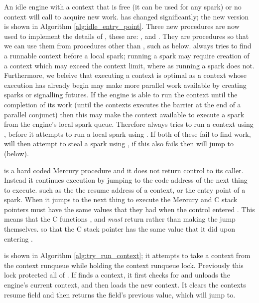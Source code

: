 An idle engine with a context that is free (it can be used for any spark) or
no context will call \idle to acquire new work.
\idle has changed significantly;
the new version is shown in Algorithm \ref{alg:idle_entry_point}.
Three new procedures are now used to implement the details of \idle, these
are:
\tryruncontext, \tryrunlocalspark and \trystealspark.
They are procedures so that we can use them from procedures other than
\idle, such as \joinandcontinue below.
\idle always tries to find a runnable context before a local spark;
running a spark may require creation of a context which may exceed the
context limit,
where as running a spark does not.
Furthermore,
we beleive that executing a context is optimal
as a context whose execution has already begin may make more parallel work
available by creating sparks or signalling futures.
If the engine is able to run the context until the completion of its work
(until the contexts executes the \joinandcontinue barrier at the end of a
parallel conjunct)
then this may make the context available to execute a spark from the
engine's local spark queue.
Therefore \idle always tries to run a context using \tryruncontext,
before it attempts to run a local spark using \tryrunlocalspark.
If both of these fail to find work, \idle will then attempt to steal a spark using
\trystealspark,
if this also fails then \idle will jump to \sleep (below).

\idle is a hard coded Mercury procedure and it does not return control to
its caller.
Instead it continues execution by jumping to the code address of the next
thing to execute.
such as the
the resume address of a context,
or the entry point of a spark.
When it jumps to the next thing to execute the Mercury and C stack pointers
must have the same values that they had when the control entered \idle.
This means that the C functions \tryruncontext, \tryrunlocalspark and
\trystealspark \emph{must} return
rather than making the jump themselves.
so that the C stack pointer has the same value that it did upon entering
\idle.

\tryruncontext is shown in Algorithm \ref{alg:try_run_context};
it attempts to take a context from the context runqueue while holding the
context runqueue lock.
Previously this lock protected all of \idle.
If \tryruncontext finds a context,
it first checks for and unloads the engine's current context,
and then loads the new context.
It clears the contexts resume field and then returns the field's previous
value, which \idle will jump to.

